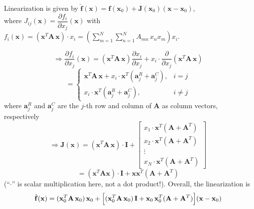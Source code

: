 \begin{solution}
    Linearization is given by $\hat{\mathbf{f}}(\mathbf{x}) = \mathbf{f}(\mathbf{x}_0) + \mathbf{J}(\mathbf{x}_0)(\mathbf{x} - \mathbf{x}_0)$, \\[4pt]
    where $J_{ij}(\mathbf{x}) = \dfrac{\partial f_i}{\partial x_j}(\mathbf{x})$ 
    with \(\displaystyle f_i(\mathbf{x}) = (\mathbf{x}^T \mathbf{A}\,\mathbf{x}) \cdot x_i = \left(\sum_{m=1}^N \sum_{n=1}^N A_{mn}\,x_n x_m\right) x_i\).

    \[
        \Rightarrow \frac{\partial f_i}{\partial x_j}(\mathbf{x}) = (\mathbf{x}^T \mathbf{A}\,\mathbf{x})\frac{\partial x_i}{\partial x_j} + x_i \cdot \frac{\partial}{\partial x_j}(\mathbf{x}^T \mathbf{A}\,\mathbf{x})
    \]
    \[
        = \begin{cases} 
            \mathbf{x}^T \mathbf{A}\,\mathbf{x} + x_i \cdot \mathbf{x}^T\!\left(\mathbf{a}_j^R + \mathbf{a}_j^C\right), & i = j \\[4pt] 
            x_i \cdot \mathbf{x}^T\!\left(\mathbf{a}_j^R + \mathbf{a}_j^C\right), & i \neq j 
        \end{cases}
    \]
    where $\mathbf{a}_j^R$ and $\mathbf{a}_j^C$ are the $j$-th row and column of $\mathbf{A}$ as column vectors, respectively
    \[
        \Rightarrow \mathbf{J}(\mathbf{x}) = (\mathbf{x}^T \mathbf{A}\,\mathbf{x}) \cdot \mathbf{I} +
        \begin{bmatrix} x_1 \cdot \mathbf{x}^T(\mathbf{A}+\mathbf{A}^T) \\ x_2 \cdot \mathbf{x}^T(\mathbf{A}+\mathbf{A}^T) \\ \vdots \\ x_N \cdot \mathbf{x}^T(\mathbf{A}+\mathbf{A}^T) \end{bmatrix}
    \]
    \[
        = (\mathbf{x}^T \mathbf{A}\mathbf{x}) \cdot \mathbf{I} + \mathbf{x}\mathbf{x}^T(\mathbf{A}+\mathbf{A}^T)
    \]
    (``$\cdot$'' is scalar multiplication here, not a dot product!). Overall, the linearization is
    \[\displaystyle
        \hat{\mathbf{f}}(\mathbf{x}) = (\mathbf{x}_0^T \mathbf{A}\,\mathbf{x}_0)\,\mathbf{x}_0 + \Bigl[(\mathbf{x}_0^T \mathbf{A}\,\mathbf{x}_0)\,\mathbf{I} + \mathbf{x}_0\,\mathbf{x}_0^T(\mathbf{A}+\mathbf{A}^T)\Bigr](\mathbf{x} - \mathbf{x}_0)
    \]
\end{solution}

